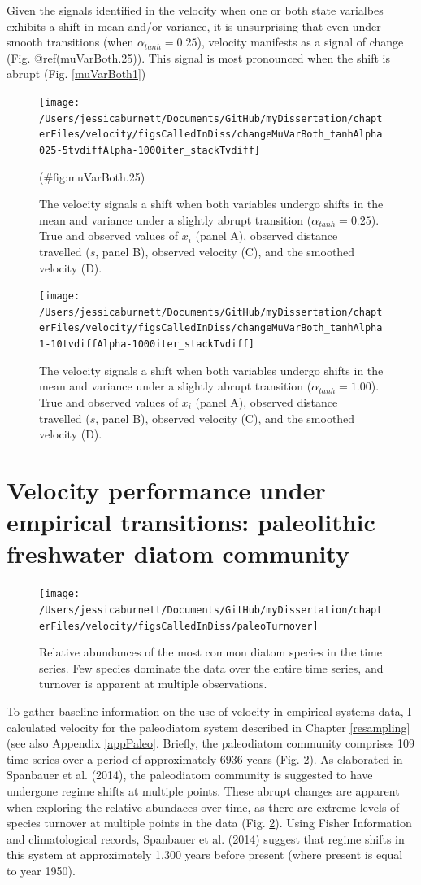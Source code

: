 \documentclass[12pt,twoside,openany]{reedthesis}
\begin{document}
Given the signals identified in the velocity when one or both state varialbes exhibits a shift in mean and/or variance, it is unsurprising that even under smooth transitions (when \(\alpha_{tanh} = 0.25\)), velocity manifests as a signal of change (Fig. @ref(muVarBoth.25)). This signal is most pronounced when the shift is abrupt (Fig. \ref{muVarBoth1})
\begin{figure}
\texttt{[image: /Users/jessicaburnett/Documents/GitHub/myDissertation/chapterFiles/velocity/figsCalledInDiss/changeMuVarBoth\_tanhAlpha025-5tvdiffAlpha-1000iter\_stackTvdiff]} \caption{The velocity signals a shift when both variables undergo shifts in the mean and variance under a slightly abrupt transition ($\alpha_{tanh}=0.25$). True and observed values of $x_i$ (panel A), observed distance travelled ($s$, panel B), observed velocity (C), and the smoothed velocity (D). }(\#fig:muVarBoth.25)
\end{figure}
\begin{figure}
\texttt{[image: /Users/jessicaburnett/Documents/GitHub/myDissertation/chapterFiles/velocity/figsCalledInDiss/changeMuVarBoth\_tanhAlpha1-10tvdiffAlpha-1000iter\_stackTvdiff]} \caption{The velocity signals a shift when both variables undergo shifts in the mean and variance under a slightly abrupt transition ($\alpha_{tanh}=1.00$). True and observed values of $x_i$ (panel A), observed distance travelled ($s$, panel B), observed velocity (C), and the smoothed velocity (D). }\label{fig:muVarBoth1}
\end{figure}
\hypertarget{velocity-performance-under-empirical-transitions-paleolithic-freshwater-diatom-community}{%
\section{Velocity performance under empirical transitions: paleolithic freshwater diatom community}\label{velocity-performance-under-empirical-transitions-paleolithic-freshwater-diatom-community}}
\begin{figure}
\texttt{[image: /Users/jessicaburnett/Documents/GitHub/myDissertation/chapterFiles/velocity/figsCalledInDiss/paleoTurnover]} \caption{Relative abundances of the most common diatom species in the time series. Few species dominate the data over the entire time series, and turnover is apparent at multiple observations.}\label{fig:paleoTurnover}
\end{figure}
To gather baseline information on the use of velocity in empirical systems data, I calculated velocity for the paleodiatom system described in Chapter \ref{resampling} (see also Appendix \ref{appPaleo}. Briefly, the paleodiatom community comprises 109 time series over a period of approximately 6936 years (Fig. \ref{fig:paleoTurnover}). As elaborated in Spanbauer et al. (2014), the paleodiatom community is suggested to have undergone regime shifts at multiple points. These abrupt changes are apparent when exploring the relative abundaces over time, as there are extreme levels of species turnover at multiple points in the data (Fig. \ref{fig:paleoTurnover}). Using Fisher Information and climatological records, Spanbauer et al. (2014) suggest that regime shifts in this system at approximately 1,300 years before present (where present is equal to year 1950).
\end{document}
